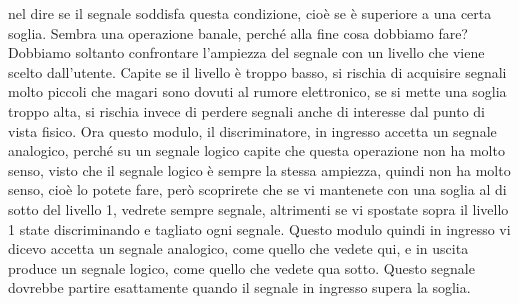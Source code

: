 {nel dire se il segnale soddisfa questa condizione, cioè se è superiore a una certa soglia. Sembra una operazione banale, perché alla fine cosa dobbiamo fare? Dobbiamo soltanto confrontare l'ampiezza del segnale con un livello che viene scelto dall'utente. Capite se il livello è troppo basso, si rischia di acquisire segnali molto piccoli che magari sono dovuti al rumore elettronico, se si mette una soglia troppo alta, si rischia invece di perdere segnali anche di interesse dal punto di vista fisico. Ora questo modulo, il discriminatore, in ingresso accetta un segnale analogico, perché su un segnale logico capite che questa operazione non ha molto senso, visto che il segnale logico è sempre la stessa ampiezza, quindi non ha molto senso, cioè lo potete fare, però scoprirete che se vi mantenete con una soglia al di sotto del livello 1, vedrete sempre segnale, altrimenti se vi spostate sopra il livello 1 state discriminando e tagliato ogni segnale. Questo modulo quindi in ingresso vi dicevo accetta un segnale analogico, come quello che vedete qui, e in uscita produce un segnale logico, come quello che vedete qua sotto. Questo segnale dovrebbe partire esattamente quando il segnale in ingresso supera la soglia. 


}
